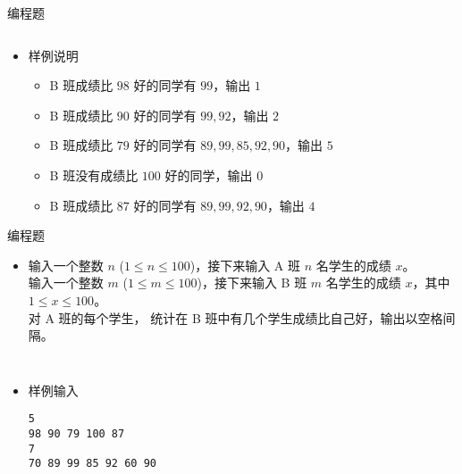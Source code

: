 \begin{frame}[fragile]
{{\begin{exampleblock}{编程题}
\begin{columns}[onlytextwidth,T]
\begin{itemize}
                    \end{itemize}
                \end{columns}

                \begin{itemize}
                    \item 样例说明\\
                    \begin{itemize}
                        \item<3-> B 班成绩比 $98$ 好的同学有 $99$，输出 $1$
                        \item<4-> B 班成绩比 $90$ 好的同学有 $99,92$，输出 $2$
                        \item<5-> B 班成绩比 $79$ 好的同学有 $89,99,85,92,90$，输出 $5$
                        \item<6-> B 班没有成绩比 $100$ 好的同学，输出 $0$
                        \item<7-> B 班成绩比 $87$ 好的同学有 $89,99,92,90$，输出 $4$
                    \end{itemize}
                \end{itemize}
            \end{exampleblock}

        }{
            \begin{exampleblock}{编程题}

                \begin{itemize}
                    \item 输入一个整数 $n$ ($1 \le n \le 100$)，接下来输入 A 班 $n$ 名学生的成绩 $x$。\\
                        输入一个整数 $m$ ($1 \le m \le 100$)，接下来输入 B 班 $m$ 名学生的成绩 $x$，其中 $1 \le x \le 100$。\\
                        对 A 班的每个学生， 统计在 B 班中有几个学生成绩比自己好，输出以空格间隔。
                \end{itemize}

                \begin{columns}[onlytextwidth,T]
                    \begin{itemize}
                        \item 样例输入

                            \lstinline|5|\\
                            \lstinline|98 90 79 100 87|\\
                            \lstinline|7|\\
                            \lstinline|70 89 99 85 92 60 90|


\end{itemize}
\end{columns}
\end{exampleblock}}}
\end{frame}

